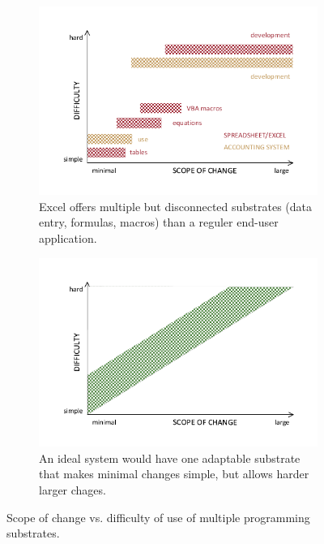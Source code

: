 \documentclass[runningheads]{llncs}
\begin{document}
\begin{figure}[t]
\centering
\begin{subfigure}{0.48\textwidth}
   \noindent
   \includegraphics[scale=0.65]{figures/sub1.pdf}
   \caption{Excel offers multiple but disconnected substrates (data entry, formulas, macros) than a reguler end-user application.}
   \label{fig:sub1}
\end{subfigure}
\hfill
\begin{subfigure}{0.48\textwidth}
   \noindent
   \includegraphics[scale=0.65]{figures/sub2.pdf}
   \caption{An ideal system would have one adaptable substrate that makes minimal changes simple, but allows harder larger chages.}
   \label{fig:sub2}
\end{subfigure}
\caption{Scope of change vs. difficulty of use of multiple programming substrates.}
\label{fig:substrates}
\end{figure}
\end{document}
